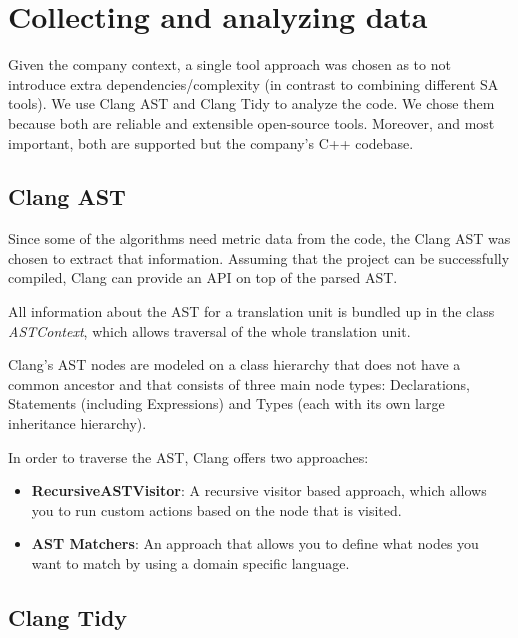 
\section{Collecting and analyzing data}\label{sec:data}

Given the company context, a single tool approach was chosen as to not introduce extra dependencies/complexity (in contrast to combining different SA tools).
We use Clang AST \cite{clang_ast} and Clang Tidy \cite{clang_tidy} to analyze the code. We chose them because both are reliable and extensible open-source tools. Moreover, and most important, both are supported but the company's C++ codebase.



\subsection{Clang AST}
Since some of the algorithms need metric data from the code, the Clang AST was chosen to extract that information. Assuming that the project can be successfully compiled, Clang can provide an API on top of the parsed AST.  

All information about the AST for a translation unit is bundled up in the class \textit{ASTContext}, which allows traversal of the whole translation unit.

Clang’s AST nodes are modeled on a class hierarchy that does not have a common ancestor and that consists of three main node types: Declarations, Statements (including Expressions) and Types (each with its own large inheritance hierarchy).

In order to traverse the AST, Clang offers two approaches:
\begin{itemize}
	\item \textbf{RecursiveASTVisitor}: A recursive visitor based approach, which allows you to run custom actions based on the node that is visited.
	\item \textbf{AST Matchers}: An approach that allows you to define what nodes you want to match by using a domain specific language.
\end{itemize}

\subsection{Clang Tidy}

